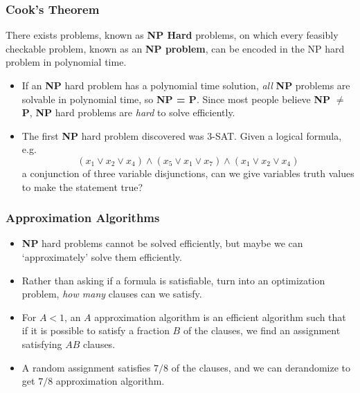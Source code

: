 \documentclass{beamer}
\begin{document}
\begin{frame}
    \frametitle{Cook's Theorem}

    \begin{theorem}
        There exists problems, known as {\bf NP Hard} problems, on which every feasibly checkable problem, known as an {\bf NP problem}, can be encoded in the NP hard problem in polynomial time.
    \end{theorem}

    \begin{itemize}
        \item If an {\bf NP} hard problem has a polynomial time solution, {\it all} {\bf NP} problems are solvable in polynomial time, so {\bf NP = P}. Since most people believe {\bf NP} $\neq$ {\bf P}, {\bf NP} hard problems are {\it hard} to solve efficiently.

        \item The first {\bf NP} hard problem discovered was 3-SAT. Given a logical formula, e.g.
        \[ (x_1 \vee x_2 \vee x_4) \wedge (x_5 \vee x_1 \vee x_7) \wedge (x_1 \vee x_2 \vee x_4) \]
        a conjunction of three variable disjunctions, can we give variables truth values to make the statement true?
    \end{itemize}
\end{frame}

\begin{frame}
    \frametitle{Approximation Algorithms}

    \begin{itemize}
        \item {\bf NP} hard problems cannot be solved efficiently, but maybe we can `approximately' solve them efficiently.

        \item Rather than asking if a formula is satisfiable, turn into an optimization problem, {\it how many} clauses can we satisfy.

        \item For $A < 1$, an $A$ approximation algorithm is an efficient algorithm such that if it is possible to satisfy a fraction $B$ of the clauses, we find an assignment satisfying $AB$ clauses.

        \item A random assignment satisfies $7/8$ of the clauses, and we can derandomize to get $7/8$ approximation algorithm.
    \end{itemize}
\end{frame}
\end{document}
